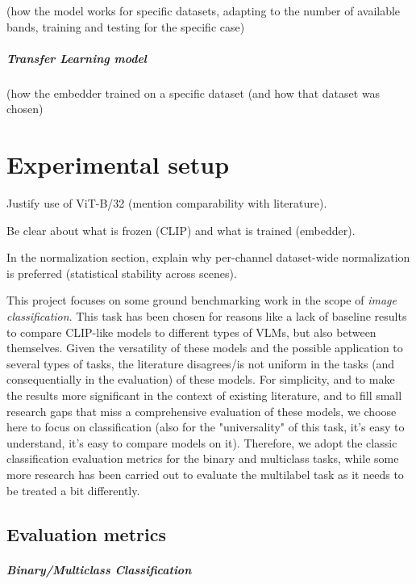 \documentclass[a4paper, oneside, english]{sapthesis} %
\begin{document}
(how the model works for specific datasets, adapting to the number of available bands, training and testing for the specific case)

\paragraph{Transfer Learning model}

(how the embedder trained on a specific dataset (and how that dataset was chosen) 

\chapter{Experimental setup} %

Justify use of ViT-B/32 (mention comparability with literature).

Be clear about what is frozen (CLIP) and what is trained (embedder).

In the normalization section, explain why per-channel dataset-wide normalization is preferred (statistical stability across scenes).


This project focuses on some ground benchmarking work in the scope of \emph{image classification}. This task has been chosen for reasons like a lack of baseline results to compare CLIP-like models to different types of VLMs, but also between themselves. Given the versatility of these models and the possible application to several types of tasks, the literature disagrees/is not uniform in the tasks (and consequentially in the evaluation) of these models. For simplicity, and to make the results more significant in the context of existing literature, and to fill small research gaps that miss a comprehensive evaluation of these models, we choose here to focus on classification (also for the "universality" of this task, it's easy to understand, it's easy to compare models on it). Therefore, we adopt the classic classification evaluation metrics for the binary and multiclass tasks, while some more research has been carried out to evaluate the multilabel task as it needs to be treated a bit differently.

\section{Evaluation metrics}

\paragraph{Binary/Multiclass Classification}
\end{document}
